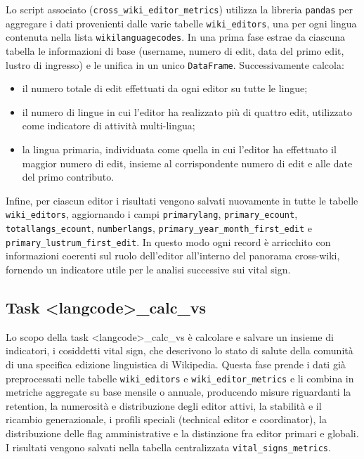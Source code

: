 Lo script associato (\texttt{cross\_wiki\_editor\_metrics}) utilizza la libreria \texttt{pandas} per aggregare i dati provenienti dalle varie tabelle \texttt{wiki\_editors}, una per ogni lingua contenuta nella lista \texttt{wikilanguagecodes}. In una prima fase estrae da ciascuna tabella le informazioni di base (username, numero di edit, data del primo edit, lustro di ingresso) e le unifica in un unico \texttt{DataFrame}. Successivamente calcola:
\begin{itemize}
    \item il numero totale di edit effettuati da ogni editor su tutte le lingue;
    \item il numero di lingue in cui l’editor ha realizzato più di quattro edit, utilizzato come indicatore di attività multi-lingua;
    \item la lingua primaria, individuata come quella in cui l’editor ha effettuato il maggior numero di edit, insieme al corrispondente numero di edit e alle date del primo contributo.
\end{itemize}

Infine, per ciascun editor i risultati vengono salvati nuovamente in tutte le tabelle \texttt{wiki\_editors}, aggiornando i campi \texttt{primarylang}, \texttt{primary\_ecount}, \texttt{totallangs\_ecount}, \texttt{numberlangs}, \texttt{primary\_year\_month\_first\_edit} e \texttt{primary\_lustrum\_first\_edit}. In questo modo ogni record è arricchito con informazioni coerenti sul ruolo dell’editor all’interno del panorama cross-wiki, fornendo un indicatore utile per le analisi successive sui vital sign.

\subsection{Task \textless langcode\textgreater\_calc\_vs}
\label{subsec:calc_vs}

Lo scopo della task \textless langcode\textgreater\_calc\_vs è calcolare e salvare un insieme di indicatori, i cosiddetti vital sign, che descrivono lo stato di salute della comunità di una specifica edizione linguistica di Wikipedia. 
Questa fase prende i dati già preprocessati nelle tabelle \texttt{wiki\_editors} e \texttt{wiki\_editor\_metrics} e li combina in metriche aggregate su base mensile o annuale, producendo misure riguardanti la retention, la numerosità e distribuzione degli editor attivi, la stabilità e il ricambio generazionale, i profili speciali (technical editor e coordinator), la distribuzione delle flag amministrative e la distinzione fra editor primari e globali. 
I risultati vengono salvati nella tabella centralizzata \texttt{vital\_signs\_metrics}.


